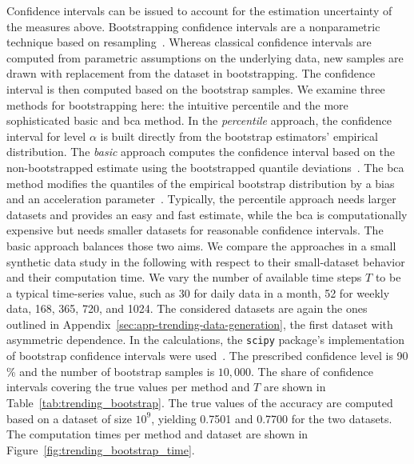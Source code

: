 Confidence intervals can be issued to account for the estimation uncertainty of the measures above.
Bootstrapping confidence intervals are a nonparametric technique based on resampling~\parencite[for introductions see][]{Hesterberg2011,Bittmann2021}.
Whereas classical confidence intervals are computed from parametric assumptions on the underlying data, new samples are drawn with replacement from the dataset in bootstrapping.
The confidence interval is then computed based on the bootstrap samples.
We examine three methods for bootstrapping here: the intuitive percentile and the more sophisticated basic and \ac{bca} method.
In the \textit{percentile} approach, the confidence interval for level $\alpha$ is built directly from the bootstrap estimators' empirical distribution.
The \textit{basic} approach computes the confidence interval based on the non-bootstrapped estimate using the bootstrapped quantile deviations~\parencite{Davison1997}.
The \ac{bca} method modifies the quantiles of the empirical bootstrap distribution by a bias and an acceleration parameter~\parencite{Efron1987}.
Typically, the percentile approach needs larger datasets and provides an easy and fast estimate, while the \ac{bca} is computationally expensive but needs smaller datasets for reasonable confidence intervals.
The basic approach balances those two aims.
We compare the approaches in a small synthetic data study in the following with respect to their small-dataset behavior and their computation time.
We vary the number of available time steps $T$ to be a typical time-series value, such as 30 for daily data in a month, 52 for weekly data, 168, 365, 720, and 1024.
The considered datasets are again the ones outlined in Appendix~\ref{sec:app-trending-data-generation}, the first dataset with asymmetric dependence.
In the calculations, the \verb|scipy| package's implementation of bootstrap confidence intervals were used~\parencite{Virtanen2020}.
The prescribed confidence level is 90 \% and the number of bootstrap samples is $10,000$.
The share of confidence intervals covering the true values per method and $T$ are shown in Table~\ref{tab:trending_bootstrap}.
The true values of the accuracy are computed based on a dataset of size $10^9$, yielding 0.7501 and 0.7700 for the two datasets.
The computation times per method and dataset are shown in Figure~\ref{fig:trending_bootstrap_time}.

